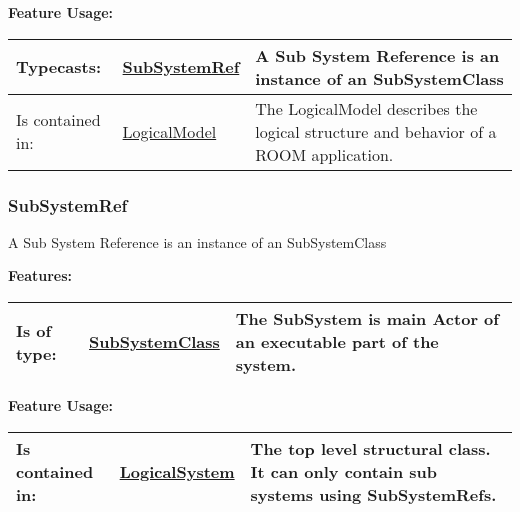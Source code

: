 	\begingroup
	\textbf{Feature Usage:}
	\renewcommand{\arraystretch}{1.8} %
	\begin{longtable}{l|l p{}}
		\hline
	Typecasts: & \tabitem \hyperlink{ref:SubSystemRef}{SubSystemRef}  & A Sub System Reference is an instance of an SubSystemClass\\
	\hline
	Is contained in: & \tabitem \hyperlink{ref:LogicalModel}{LogicalModel}  & The LogicalModel describes the logical structure and behavior of a ROOM application.\\
	\hline
	\end{longtable}
	\endgroup
		
	
	\vspace{\baselineskip}
	\vspace{\baselineskip}
	\vspace{\baselineskip}
	
\subsubsection{SubSystemRef}
	\hypertarget{ref:SubSystemRef}{}
	A Sub System Reference is an instance of an SubSystemClass
		
		
		
	\begingroup
	\textbf{Features:}
	\renewcommand{\arraystretch}{1.8} %
	\begin{longtable}{l|l p{}}
		\hline
	Is of type: & \tabitem \hyperlink{ref:SubSystemClass}{SubSystemClass}  & The SubSystem is main Actor of an executable part of the system. \\
	\hline
	\end{longtable}
	\endgroup
		
	\begingroup
	\textbf{Feature Usage:}
	\renewcommand{\arraystretch}{1.8} %
	\begin{longtable}{l|l p{}}
		\hline
	Is contained in: & \tabitem \hyperlink{ref:LogicalSystem}{LogicalSystem}  & The top level structural class. It can only contain sub systems using SubSystemRefs.\\
	\hline
	\end{longtable}
	\endgroup
		
	
	\vspace{\baselineskip}
	\vspace{\baselineskip}
	\vspace{\baselineskip}
	
